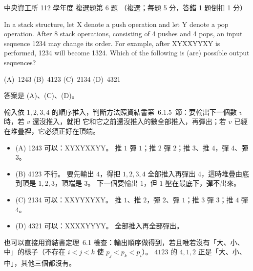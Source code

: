 \begin{pastexam}[label={px:ncu-112-dsa-06}]{中央資工所 112 學年度 複選題第 6 題}
（複選；每題 5 分，答錯 1 題倒扣 1 分）

In a stack structure, let X denote a push operation and let Y denote a pop operation. After 8 stack
operations, consisting of 4 pushes and 4 pops, an input sequence 1234 may change its order. For example,
after XYXXYYXY is performed, 1234 will become 1324. Which of the following is (are) possible output
sequences?

(A)~1243 \qquad (B)~4123 \qquad (C)~2134 \qquad (D)~4321
\end{pastexam}

\begin{pastsoln}
答案是 (A)、(C)、(D)。

輸入依 $1, 2, 3, 4$ 的順序推入，判斷方法照資結書第~6.1.5~節：要輸出下一個數 $v$ 時，若 $v$ 還沒推入，就把
它和它之前還沒推入的數全部推入，再彈出；若 $v$ 已經在堆疊裡，它必須正好在頂端。

\begin{itemize}
\item (A) 1243 可以：XYXYXXYY。 推 $1$ 彈 $1$；推 $2$ 彈 $2$；推 $3$、推 $4$，彈 $4$、彈 $3$。
\item (B) 4123 不行。 要先輸出 $4$，得把 $1, 2, 3, 4$ 全部推入再彈出 $4$，這時堆疊由底到頂是
$1, 2, 3$，頂端是 $3$。 下一個要輸出 $1$，但 $1$ 壓在最底下，彈不出來。
\item (C) 2134 可以：XXYYXYXY。 推 $1$、推 $2$，彈 $2$、彈 $1$；推 $3$ 彈 $3$；推 $4$ 彈 $4$。
\item (D) 4321 可以：XXXXYYYY。 全部推入再全部彈出。
\end{itemize}
也可以直接用資結書定理~6.1 檢查：輸出順序做得到，若且唯若沒有「大、小、中」的樣子（不存在
$i < j < k$ 使 $p_j < p_k < p_i$）。 $4123$ 的 $4, 1, 2$ 正是「大、小、中」，其他三個都沒有。
\end{pastsoln}
